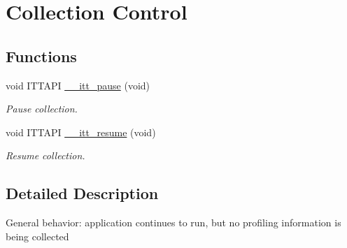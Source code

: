 \hypertarget{group__legacy__control}{}\section{Collection Control}
\label{group__legacy__control}
\subsection*{Functions}
\begin{DoxyCompactItemize}
\item 
\hypertarget{group__legacy__control_gad78ccc44054839ddacb2f9c6a1db05f0}{}void I\+T\+T\+A\+P\+I \hyperlink{group__legacy__control_gad78ccc44054839ddacb2f9c6a1db05f0}{\+\_\+\+\_\+itt\+\_\+pause} (void)\label{group__legacy__control_gad78ccc44054839ddacb2f9c6a1db05f0}

\begin{DoxyCompactList}\small\item\em Pause collection. \end{DoxyCompactList}\item 
\hypertarget{group__legacy__control_ga49d9a951d74ef2fe9f93d2a60adfe0e9}{}void I\+T\+T\+A\+P\+I \hyperlink{group__legacy__control_ga49d9a951d74ef2fe9f93d2a60adfe0e9}{\+\_\+\+\_\+itt\+\_\+resume} (void)\label{group__legacy__control_ga49d9a951d74ef2fe9f93d2a60adfe0e9}

\begin{DoxyCompactList}\small\item\em Resume collection. \end{DoxyCompactList}\end{DoxyCompactItemize}


\subsection{Detailed Description}
General behavior\+: application continues to run, but no profiling information is being collected

